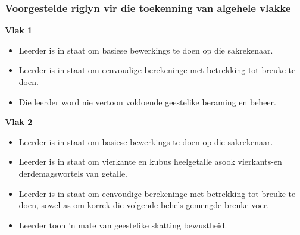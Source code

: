 \subsubsection{Voorgestelde riglyn vir die toekenning van algehele vlakke}
\textbf{Vlak 1}
\begin{itemize}[noitemsep]
\item
Leerder is in staat om basiese bewerkings te doen op die sakrekenaar.
\item
Leerder is in staat om eenvoudige berekeninge met betrekking tot
breuke te doen.
\item
Die leerder word nie vertoon voldoende geestelike beraming en beheer.
\end{itemize}
\textbf{Vlak 2}\begin{itemize}[noitemsep]
\item
Leerder is in staat om basiese bewerkings te doen op die sakrekenaar.
\item
Leerder is in staat om vierkante en kubus heelgetalle asook
vierkants-en derdemagswortels van getalle.
\item
Leerder is in staat om eenvoudige berekeninge met betrekking tot
breuke te doen, sowel as om korrek die volgende behels gemengde breuke
voer.
\item
Leerder toon 'n mate van geestelike skatting bewustheid.
\end{itemize}
